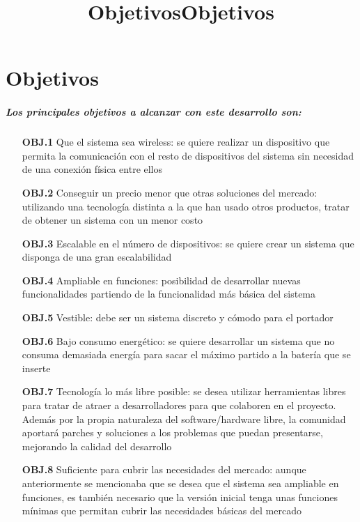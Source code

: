 \chapter{Objetivos}
\title{Objetivos}
\title{Objetivos}

\paragraph{
Los principales objetivos a alcanzar con este desarrollo son:
}
  \begin{itemize}
    \item[\textbf{OBJ.1}] Que el sistema sea wireless: se quiere realizar un dispositivo que permita la comunicación con el resto de dispositivos del sistema sin necesidad de una conexión física entre ellos
    \item[\textbf{OBJ.2}] Conseguir un precio menor que otras soluciones del mercado: utilizando una tecnología distinta a la que han usado otros productos, tratar de obtener un sistema con un menor costo
    \item[\textbf{OBJ.3}] Escalable en el número de dispositivos: se quiere crear un sistema que disponga de una gran escalabilidad
    \item[\textbf{OBJ.4}] Ampliable en funciones: posibilidad de desarrollar nuevas funcionalidades partiendo de la funcionalidad más básica del sistema
    \item[\textbf{OBJ.5}] Vestible: debe ser un sistema discreto y cómodo para el portador
    \item[\textbf{OBJ.6}] Bajo consumo energético: se quiere desarrollar un sistema que no consuma demasiada energía para sacar el máximo partido a la batería que se inserte
    \item[\textbf{OBJ.7}] Tecnología lo más libre posible: se desea utilizar herramientas libres para tratar de atraer a desarrolladores para que colaboren en el proyecto. Además por la propia naturaleza del software/hardware libre, la comunidad aportará parches y soluciones a los problemas que puedan presentarse, mejorando la calidad del desarrollo
    \item[\textbf{OBJ.8}] Suficiente para cubrir las necesidades del mercado: aunque anteriormente se mencionaba que se desea que el sistema sea ampliable en funciones, es también necesario que la versión inicial tenga unas funciones mínimas que permitan cubrir las necesidades básicas del mercado
  \end{itemize}

